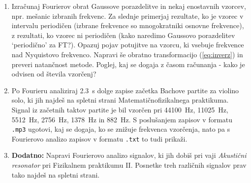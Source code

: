 \documentclass[slovene,11pt,a4paper]{article}
\begin{document}
\begin{enumerate}
\item Izračunaj Fourierov obrat Gaussove porazdelitve in nekaj enostavnih vzorcev,
npr. mešanic izbranih frekvenc. Za slednje primerjaj rezultate, ko
je vzorec v intervalu periodičen (izbrane frekvence so mnogokratniki
osnovne frekvence), z rezultati, ko vzorec ni periodičen (kako naredimo Gaussovo porazdelitev `periodično' za FT?).
Opazuj pojav potujitve na vzorcu, ki vsebuje frekvence nad Nyquistovo
frekvenco. Napravi še obratno transformacijo (\ref{eq:inverz}) in preveri
natančnost metode. Poglej, kaj se dogaja z časom računanja - kako je odvisen od števila vzorčenj?
\item Po Fourieru analiziraj \SI{2.3}{s} dolge zapise začetka Bachove
partite za violino solo, ki jih najdeš na spletni strani
Matematičnofizikalnega praktikuma.  Signal iz začetnih taktov
partite je bil vzorčen pri \SI{44100}{Hz}, \SI{11025}{Hz}, \SI{5512}{Hz}, \SI{2756}{Hz},
\SI{1378}{Hz} in \SI{882}{Hz}.  S poslušanjem zapisov v formatu {\tt .mp3}
ugotovi, kaj se dogaja, ko se znižuje frekvenca vzorčenja,
nato pa s Fourierovo analizo zapisov v formatu {\tt .txt}
to tudi prikaži.
\item \textbf{Dodatno:} Napravi Fourierovo analizo signalov, ki jih dobiš pri vaji
{\sl Akustični resonator\/} pri Fizikalnem praktikumu II.
Posnetke treh različnih signalov prav tako najdeš na spletni strani.
\end{enumerate}
\end{document}
